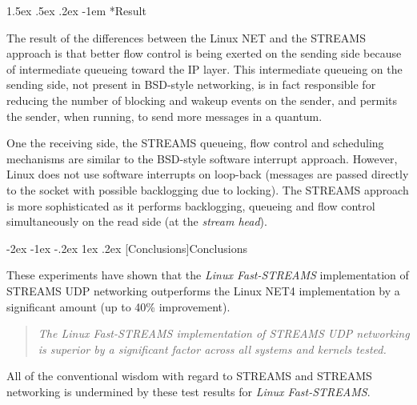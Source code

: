 \documentclass[letterpaper,final,notitlepage,twocolumn,10pt,twoside]{article}
\makeatletter
\renewcommand\section{\@startsection {section}{1}{\z@}%
                                   {-2ex \@plus -1ex \@minus -.2ex}%
                                   {1ex \@plus .2ex}%
                                   {\normalfont\large\bfseries}}
\renewcommand\paragraph{\@startsection{paragraph}{4}{\z@}%
                                    {1.5ex \@plus .5ex \@minus .2ex}%
                                    {-1em}%
                                    {\normalfont\normalsize\bfseries\slshape}}
\makeatother
\begin{document}
\paragraph*{Result}

The result of the differences between the Linux NET and the STREAMS approach
is that better flow control is being exerted on the sending side because of
intermediate queueing toward the IP layer.  This intermediate queueing on the
sending side, not present in BSD-style networking, is in fact responsible for
reducing the number of blocking and wakeup events on the sender, and permits
the sender, when running, to send more messages in a quantum.

One the receiving side, the STREAMS queueing, flow control and scheduling
mechanisms are similar to the BSD-style software interrupt approach.  However,
Linux does not use software interrupts on loop-back (messages are passed
directly to the socket with possible backlogging due to locking).  The STREAMS
approach is more sophisticated as it performs backlogging, queueing and flow
control simultaneously on the read side (at the \textit{stream head}).


\section[Conclusions]{Conclusions}

These experiments have shown that the \textsl{Linux Fast-STREAMS}
implementation of STREAMS UDP networking outperforms the Linux NET4
implementation by a significant amount (up to 40\% improvement).

\begin{quote}
\textit{The \textsl{Linux Fast-STREAMS} implementation of STREAMS UDP
networking is superior by a significant factor across all systems and kernels
tested.}
\end{quote}

All of the conventional wisdom with regard to STREAMS and STREAMS networking
is undermined by these test results for \textsl{Linux Fast-STREAMS}.
\end{document}
